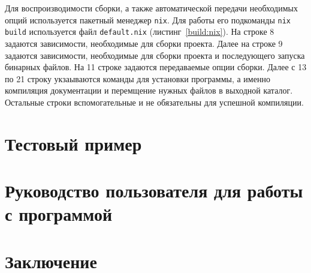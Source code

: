 \documentclass[chapterprefix=true,headings=onelineappendix]{scrartcl}
\begin{document}

Для воспроизводимости сборки, а также автоматической передачи необходимых опций
используется пакетный менеджер \verb|nix|. Для работы его подкоманды \verb|nix build|
используется файл \verb|default.nix| (листинг~\ref{build:nix}). На строке 8
задаются зависимости, необходимые для сборки проекта. Далее на строке 9
задаются зависимости, необходимые для сборки проекта и последующего запуска
бинарных файлов. На 11 строке задаются передаваемые опции сборки. Далее с 13 по
21 строку укзаываются команды для установки программы, а именно компиляция
документации и перемщение нужных файлов в выходной каталог. Остальные строки
вспомогательные и не обязательны для успешной компиляции.


\newpage{}
\section{Тестовый пример}

\newpage{}
\section{Руководство пользователя для работы с программой}

\newpage{}
\section*{Заключение}

\newpage{}
\printbibliography[ heading=bibintoc, ]
\end{document}
